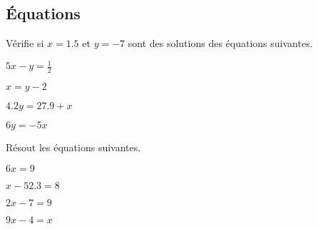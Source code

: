 \subsection{Équations}

\begin{exercicefr}
    Vérifie si $x = 1.5$ et $y = -7$ sont des solutions des équations suivantes.
    \begin{exerciceenumnoeq}
        \item $5x - y = \frac12$
        \item $x = y -2$
        \item $4.2y = 27.9 + x$
        \item $6y = -5x$
    \end{exerciceenumnoeq}
\end{exercicefr}

\begin{exercicefr}
    Résout les équations suivantes.
    \begin{exerciceenumnoeq}
        \item $6x = 9$
        \item $x - 52.3 = 8$
        \item $2x - 7 = 9$
        \item $9x - 4 = x$
    \end{exerciceenumnoeq}
\end{exercicefr}